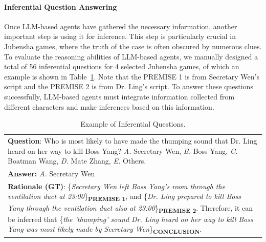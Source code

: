 \documentclass[11pt]{article}
\begin{document}
\paragraph{Inferential Question Answering}

Once LLM-based agents have gathered the necessary information, another important step is using it for inference. This step is particularly crucial in Jubensha games, where the truth of the case is often obscured by numerous clues. To evaluate the reasoning abilities of LLM-based agents, we manually designed a total of 56 inferential questions for 4 selected Jubensha games, of which an example is shown in Table~\ref{table:inferential_ques}. Note that the PREMISE 1 is from Secretary Wen's script and the PREMISE 2 is from Dr. Ling's script. To answer these questions successfully, LLM-based agents must integrate information collected from different characters and make inferences based on this information. 



\begin{table}[t]
\centering

\begin{tabularx}{0.45\textwidth}{|X|}
\hline
 \textbf{Question}: Who is most likely to have made the thumping sound that Dr. Ling heard on her way to kill Boss Yang? \textit{A.} Secretary Wen, \textit{B.} Boss Yang, \textit{C.} Boatman Wang, \textit{D.} Mate Zhang, \textit{E.} Others. \\
\textbf{Answer:} \textit{A.} Secretary Wen\\
\textbf{Rationale (GT)}: \{\textit{Secretary Wen left Boss Yang's room through the ventilation duct at 23:00}\}\textsubscript{\textbf{PREMISE 1}}, and \{\textit{Dr. Ling prepared to kill Boss Yang through the ventilation duct also at 23:00}\}\textsubscript{\textbf{PREMISE 2}}. Therefore, it can be inferred that \{\textit{the 'thumping' sound Dr. Ling heard on her way to kill Boss Yang was most likely made by Secretary Wen}\}\textsubscript{\textbf{CONCLUSION}}.\\
\hline
\end{tabularx}
\vspace{-2mm}
\caption{Example of Inferential Questions.}
\vspace{-4mm}
\label{table:inferential_ques}
\end{table}
\end{document}
